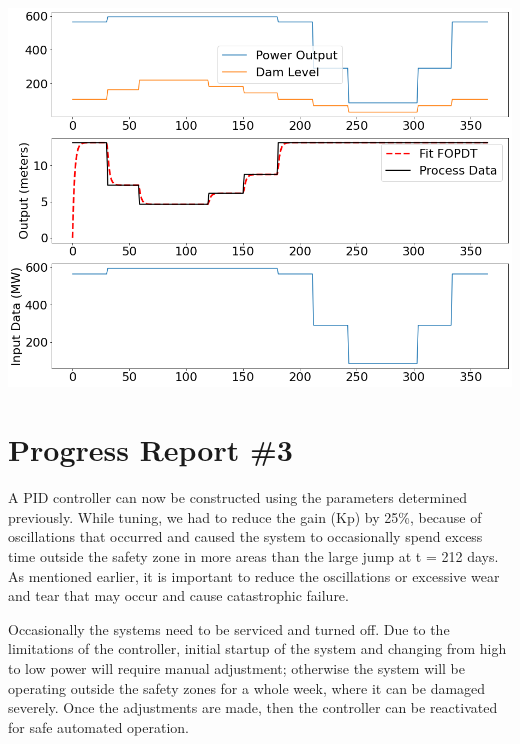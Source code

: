\documentclass{article}
\begin{document}
\begin{multicols*}{2}
        
        \vspace{5mm}
        \noindent
        \begin{minipage}{0.49\textwidth}
            \includegraphics[width=\textwidth]{FOPDT.png}
        \end{minipage}
            
        \section{Progress Report \#3}
    
        A PID controller can now be constructed using the parameters determined previously.  While tuning, we had to reduce the gain (Kp) by 25\%, because of oscillations that occurred and caused the system to occasionally spend excess time outside the safety zone in more areas than the large jump at t = 212 days.  As mentioned earlier, it is important to reduce the oscillations or excessive wear and tear that may occur and cause catastrophic failure.

        Occasionally the systems need to be serviced and turned off.  Due to the limitations of the controller, initial startup of the system and changing from high to low power will require manual adjustment; otherwise the system will be operating outside the safety zones for a whole week, where it can be damaged severely.  Once the adjustments are made, then the controller can be reactivated for safe automated operation.


\end{multicols*}
\end{document}
